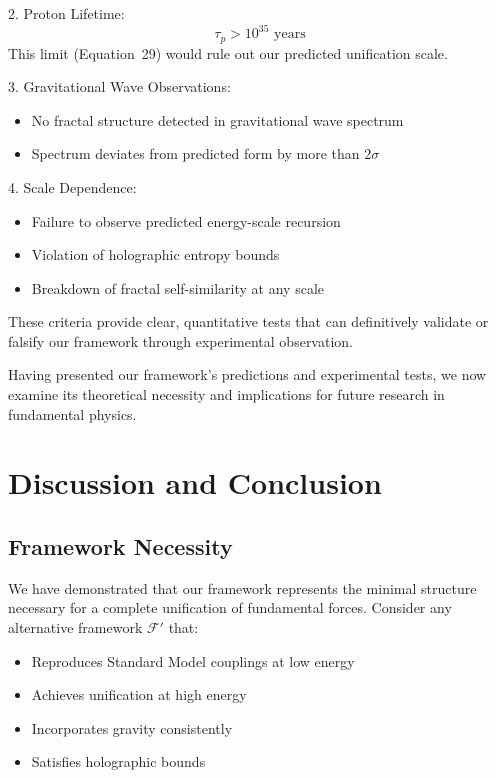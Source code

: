 \documentclass{article}
\begin{document}
2. Proton Lifetime:
   \begin{equation}
   \tau_p > 10^{35} \text{ years}
   \end{equation}
   This limit (Equation~29) would rule out our predicted unification scale.

3. Gravitational Wave Observations:
   \begin{itemize}
   \item No fractal structure detected in gravitational wave spectrum
   \item Spectrum deviates from predicted form by more than $2\sigma$
   \end{itemize}

4. Scale Dependence:
   \begin{itemize}
   \item Failure to observe predicted energy-scale recursion
   \item Violation of holographic entropy bounds
   \item Breakdown of fractal self-similarity at any scale
   \end{itemize}

These criteria provide clear, quantitative tests that can definitively validate or falsify our framework through experimental observation.

Having presented our framework's predictions and experimental tests, we now examine its theoretical necessity and implications for future research in fundamental physics.

\section{Discussion and Conclusion}

\subsection{Framework Necessity}

We have demonstrated that our framework represents the minimal structure necessary for a complete unification of fundamental forces. Consider any alternative framework $\mathcal{F}'$ that:

\begin{itemize}
\item Reproduces Standard Model couplings at low energy
\item Achieves unification at high energy
\item Incorporates gravity consistently
\item Satisfies holographic bounds
\end{itemize}
\end{document}
